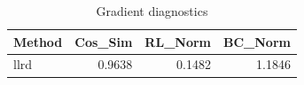 \begin{table}[htbp]
\centering
\caption{Gradient diagnostics}
\label{tab:grad-diag}
\begin{tabular}{lrrr}
\toprule
\textbf{Method} & \textbf{Cos\_Sim} & \textbf{RL\_Norm} & \textbf{BC\_Norm} \\
\midrule
llrd & 0.9638 & 0.1482 & 1.1846 \\
\bottomrule
\end{tabular}
\end{table}